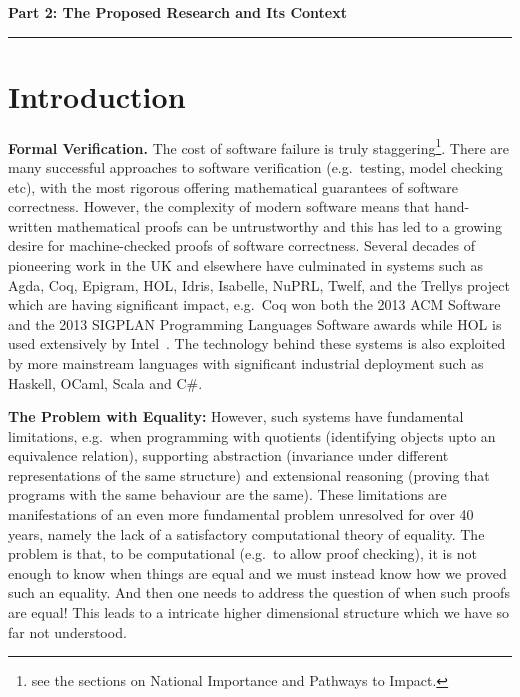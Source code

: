 \documentclass[a4paper,11pt]{article}
\newcommand{\eg}{{e.g.}\ }
\begin{document}
\newpage
\noindent
{\bf \Large Part 2: The Proposed Research and Its Context}

\vspace*{-0.23in}

\begin{center}
\rule{170mm}{.5mm}
\end{center}

\vspace*{-0.4in}

\section{Introduction}\label{sec:intro}

\vspace*{-0.1in}

{\bf Formal Verification.} The cost of software failure is truly
staggering\footnote{see the sections on National Importance and
  Pathways to Impact.}. There are many successful approaches to
software verification (\eg testing, model checking etc), with the most
rigorous offering mathematical guarantees of software
correctness. However, the complexity of modern software means that
hand-written mathematical proofs can be untrustworthy and this has led
to a growing desire for machine-checked proofs of software
correctness. Several decades of pioneering work in the UK and
elsewhere have culminated in systems such as Agda, Coq, Epigram, HOL,
Idris, Isabelle, NuPRL, Twelf, and the Trellys project which are
having significant impact, \eg Coq won both the 2013 ACM Software and
the 2013 SIGPLAN Programming Languages Software awards while HOL is
used extensively by Intel~\cite{harrison:sfm}. The technology behind
these systems is also exploited by more mainstream languages with
significant industrial deployment such as Haskell, OCaml, Scala and
C\#. 

{\bf The Problem with Equality:} However, such systems have
fundamental limitations, \eg when programming with quotients
(identifying objects upto an equivalence relation), supporting
abstraction (invariance under different representations of the same
structure) and extensional reasoning (proving that programs with the same
behaviour are the same). These limitations are manifestations of
an even more fundamental problem unresolved for over 40
years, namely the lack of a satisfactory computational theory of
equality. The problem is that, to be computational (\eg to allow proof
checking), it is not enough to know when things are equal and we must
instead know how we proved such an equality. And then one needs to
address the question of when such proofs are equal! This leads to a
intricate higher dimensional structure which we have so far not
understood.
\end{document}
